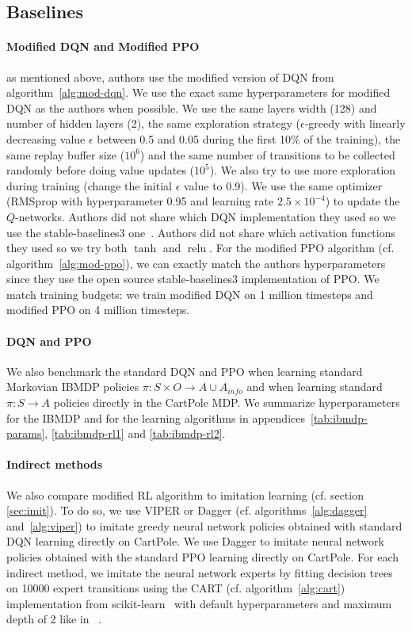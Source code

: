 \subsection{Baselines}
\paragraph{Modified DQN and Modified PPO} as mentioned above, authors use the modified version of DQN from algorithm~\ref{alg:mod-dqn}.
We use the exact same hyperparameters for modified DQN as the authors when possible. 
We use the same layers width (128) and number of hidden layers (2), the same exploration strategy ($\epsilon$-greedy with linearly decreasing value $\epsilon$ between 0.5 and 0.05 during the first 10\% of the training),
the same replay buffer size ($10^6$) and the same number of transitions to be collected randomly before doing value updates ($10^5$).
We also try to use more exploration during training (change the initial $\epsilon$ value to 0.9).
We use the same optimizer (RMSprop with hyperparameter 0.95 and learning rate $2.5 \times 10^{-4}$) to update the $Q$-networks.
Authors did not share which DQN implementation they used so we use the stable-baselines3 one~\cite{stable-baselines3}.
Authors did not share which activation functions they used so we try both $\operatorname{tanh}$ and $\operatorname{relu}$. 
For the modified PPO algorithm (cf. algorithm~\ref{alg:mod-ppo}), we can exactly match the authors hyperparameters since they use the open source stable-baselines3 implementation of PPO.
We match training budgets: we train modified DQN on 1 million timesteps and modified PPO on 4 million timesteps.

\paragraph{DQN and PPO} We also benchmark the standard DQN and PPO when learning standard Markovian IBMDP policies $\pi:S\times O\rightarrow A\cup A_{info}$ and when learning standard $\pi:S\rightarrow A$ policies directly in the CartPole MDP.
We summarize hyperparameters for the IBMDP and for the learning algorithms in appendices~\ref{tab:ibmdp-params}, \ref{tab:ibmdp-rl1} and \ref{tab:ibmdp-rl2}.

\paragraph{Indirect methods} We also compare modified RL algorithm to imitation learning (cf. section \ref{sec:imit}).
To do so, we use VIPER or Dagger (cf. algorithms~\ref{alg:dagger} and~\ref{alg:viper}) to imitate greedy neural network policies obtained with standard DQN learning directly on CartPole.
We use Dagger to imitate neural network policies obtained with the standard PPO learning directly on CartPole. 
For each indirect method, we imitate the neural network experts by fitting decision trees on 10000 expert transitions using the CART (cf. algorithm~\ref{alg:cart}) implementation from scikit-learn~\cite{scikit-learn} with default hyperparameters and maximum depth of 2 like in ~\cite{topin2021iterative}.
    
